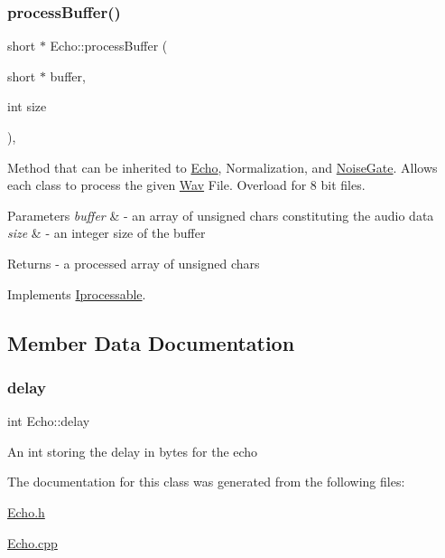\subsubsection{\texorpdfstring{process\+Buffer()}{processBuffer()}\hspace{0.1cm}{\footnotesize\ttfamily [2/2]}}
{\footnotesize\ttfamily short $\ast$ Echo\+::process\+Buffer (\begin{DoxyParamCaption}\item[{short $\ast$}]{buffer,  }\item[{int}]{size }\end{DoxyParamCaption})\hspace{0.3cm}{\ttfamily [override]}, {\ttfamily [virtual]}}

Method that can be inherited to \hyperlink{classEcho}{Echo}, Normalization, and \hyperlink{classNoiseGate}{Noise\+Gate}. Allows each class to process the given \hyperlink{classWav}{Wav} File. Overload for 8 bit files. 
\begin{DoxyParams}{Parameters}
{\em buffer} & -\/ an array of unsigned chars constituting the audio data \\
\hline
{\em size} & -\/ an integer size of the buffer \\
\hline
\end{DoxyParams}
\begin{DoxyReturn}{Returns}
-\/ a processed array of unsigned chars 
\end{DoxyReturn}


Implements \hyperlink{classIprocessable_a3a379ff1aab98b507892319afbd7eef0}{Iprocessable}.



\subsection{Member Data Documentation}
\mbox{\label{classEcho_abf5c35aa942bfae1832de23bb261e444}} 
\subsubsection{\texorpdfstring{delay}{delay}}
{\footnotesize\ttfamily int Echo\+::delay\hspace{0.3cm}{\ttfamily [private]}}

An int storing the delay in bytes for the echo 

The documentation for this class was generated from the following files\+:\begin{DoxyCompactItemize}
\item 
\hyperlink{Echo_8h}{Echo.\+h}\item 
\hyperlink{Echo_8cpp}{Echo.\+cpp}\end{DoxyCompactItemize}
